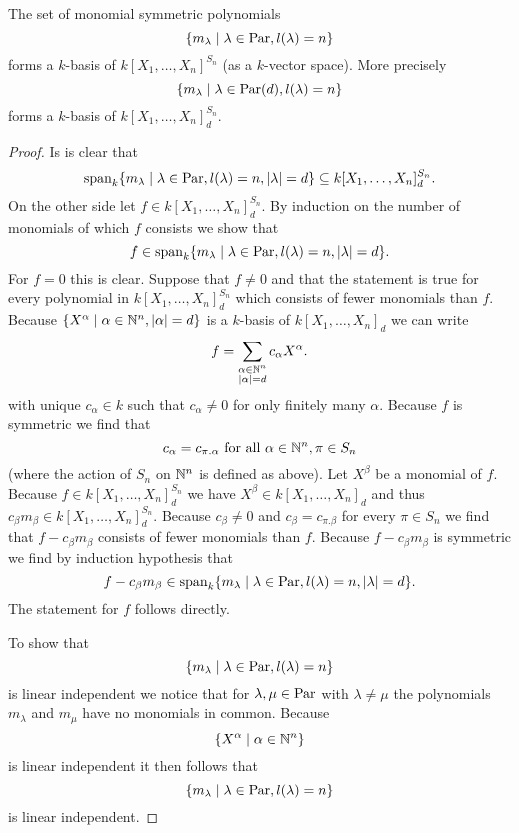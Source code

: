 \begin{lem}
 The set of monomial symmetric polynomials
 \[
  \{m_\lambda \mid \lambda \in \operatorname{Par}, l(\lambda) = n\}
 \]
 forms a $k$-basis of $k[X_1, \dotsc, X_n]^{S_n}$ (as a $k$-vector space). More precisely
 \[
  \{m_\lambda \mid \lambda \in \operatorname{Par}(d), l(\lambda) = n\}
 \]
 forms a $k$-basis of $k[X_1, \dotsc, X_n]^{S_n}_d$.
\end{lem}
\begin{proof}
 Is is clear that
 \[
  \operatorname{span}_k \{m_\lambda \mid \lambda \in \operatorname{Par}, l(\lambda) = n, |\lambda|=d \} \subseteq k[X_1, \dotsc, X_n]^{S_n}_d.
 \]
 On the other side let $f \in k[X_1, \dotsc, X_n]^{S_n}_d$. By induction on the number of monomials of which $f$ consists we show that
 \[
  f \in \operatorname{span}_k \{m_\lambda \mid \lambda \in \operatorname{Par}, l(\lambda) = n, |\lambda|=d\}.
 \]
 For $f = 0$ this is clear. Suppose that $f \neq 0$ and that the statement is true for every polynomial in $k[X_1, \dotsc, X_n]^{S_n}_d$ which consists of fewer monomials than $f$. Because $\{X^\alpha \mid \alpha \in \mathbb{N}^n, |\alpha|=d \}$ is a $k$-basis of $k[X_1, \dotsc, X_n]_d$ we can write
 \[
  f = \sum_{\substack{\alpha \in \mathbb{N}^n \\ |\alpha|=d}} c_\alpha X^\alpha.
 \]
 with unique $c_\alpha \in k$ such that $c_\alpha \neq 0$ for only finitely many $\alpha$. Because $f$ is symmetric we find that
 \[
  c_\alpha = c_{\pi.\alpha} \text{ for all } \alpha \in \mathbb{N}^n, \pi \in S_n
 \]
 (where the action of $S_n$ on $\mathbb{N}^n$ is defined as above). Let $X^\beta$ be a monomial of $f$. Because $f \in k[X_1, \dotsc, X_n]^{S_n}_d$ we have $X^\beta \in k[X_1, \dotsc, X_n]_d$ and thus $c_\beta m_\beta \in k[X_1, \dotsc, X_n]^{S_n}_d$. Because $c_\beta \neq 0$ and $c_\beta = c_{\pi.\beta}$ for every $\pi \in S_n$ we find that $f-c_{\beta}m_\beta$ consists of fewer monomials than $f$. Because $f-c_{\beta}m_\beta$ is symmetric we find by induction hypothesis that
 \[
  f - c_{\beta}m_\beta \in \operatorname{span}_k \{m_\lambda \mid \lambda \in \operatorname{Par}, l(\lambda) = n, |\lambda|=d\}.
 \]
 The statement for $f$ follows directly.
 
 To show that
 \[
  \{m_\lambda \mid \lambda \in \operatorname{Par}, l(\lambda) = n\}
 \]
 is linear independent we notice that for $\lambda, \mu \in \operatorname{Par}$ with $\lambda \neq \mu$ the polynomials $m_\lambda$ and $m_\mu$ have no monomials in common. Because
 \[
  \{X^\alpha \mid \alpha \in \mathbb{N}^n\}
 \]
 is linear independent it then follows that
 \[
  \{m_\lambda \mid \lambda \in \operatorname{Par}, l(\lambda) = n\}
 \]
 is linear independent.
\end{proof}


